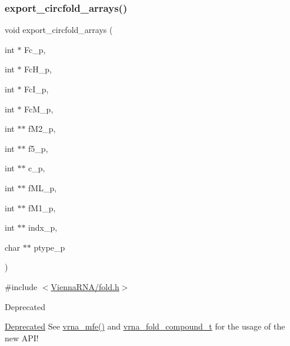 \subsubsection{\texorpdfstring{export\+\_\+circfold\+\_\+arrays()}{export\_circfold\_arrays()}}
{\footnotesize\ttfamily void export\+\_\+circfold\+\_\+arrays (\begin{DoxyParamCaption}\item[{int $\ast$}]{Fc\+\_\+p,  }\item[{int $\ast$}]{Fc\+H\+\_\+p,  }\item[{int $\ast$}]{Fc\+I\+\_\+p,  }\item[{int $\ast$}]{Fc\+M\+\_\+p,  }\item[{int $\ast$$\ast$}]{f\+M2\+\_\+p,  }\item[{int $\ast$$\ast$}]{f5\+\_\+p,  }\item[{int $\ast$$\ast$}]{c\+\_\+p,  }\item[{int $\ast$$\ast$}]{f\+M\+L\+\_\+p,  }\item[{int $\ast$$\ast$}]{f\+M1\+\_\+p,  }\item[{int $\ast$$\ast$}]{indx\+\_\+p,  }\item[{char $\ast$$\ast$}]{ptype\+\_\+p }\end{DoxyParamCaption})}



{\ttfamily \#include $<$\hyperlink{fold_8h}{Vienna\+R\+N\+A/fold.\+h}$>$}

\begin{DoxyRefDesc}{Deprecated}
\item[\hyperlink{deprecated__deprecated000078}{Deprecated}]See \hyperlink{group__mfe__fold_gabd3b147371ccf25c577f88bbbaf159fd}{vrna\+\_\+mfe()} and \hyperlink{group__fold__compound_ga1b0cef17fd40466cef5968eaeeff6166}{vrna\+\_\+fold\+\_\+compound\+\_\+t} for the usage of the new A\+P\+I!\end{DoxyRefDesc}
\mbox{\label{group__mfe__fold__single_ga004bb901e7fd2f8d5ae68f9530318ce1}} 
